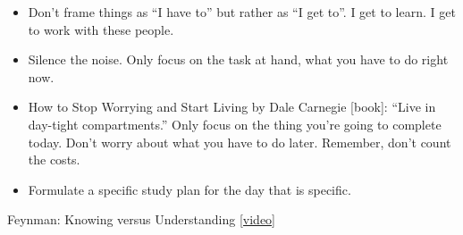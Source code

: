 \begin{itemize}
	\item Don't frame things as ``I have to'' but rather as ``I get to''. I get to learn. I get to work with these people. 
	\item Silence the noise. Only focus on the task at hand, what you have to do right now. 
	\item How to Stop Worrying and Start Living by Dale Carnegie [book]: ``Live in day-tight compartments.'' Only focus on the thing you're going to complete today. Don't worry about what you have to do later. Remember, don't count the costs. 
	\item Formulate a specific study plan for the day that is specific. 
\end{itemize}


Feynman: Knowing versus Understanding \href{https://youtu.be/NM-zWTU7X-k}{[video]}

